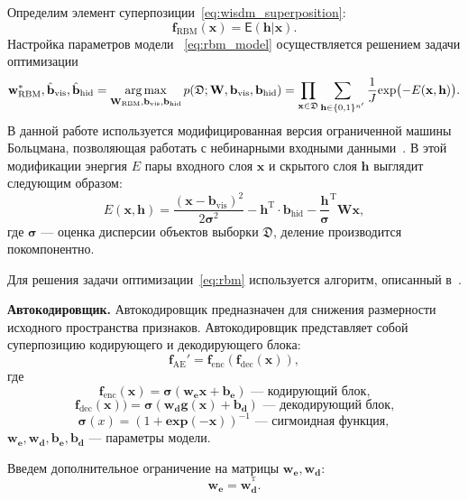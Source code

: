 Определим элемент суперпозиции~\eqref{eq:wisdm_superposition}: 
\begin{equation}
\label{eq:rbm_model}
\mathbf{f}_\text{RBM}(\mathbf{x}) = \mathsf{E}(\mathbf{h}|\mathbf{x}).
\end{equation}
Настройка параметров модели ~\eqref{eq:rbm_model} осуществляется решением задачи оптимизации
\begin{equation}
\label{eq:rbm}
{\mathbf{w}}^{*}_\text{RBM},\hat{\mathbf{b}}_\text{vis}, \hat{\mathbf{b}}_\text{hid} = \operatorname*{arg\,max}_{{\mathbf{W}_\text{RBM}},{\mathbf{b}}_\text{vis}, {\mathbf{b}}_\text{hid} } p(\mathfrak{D}; {\mathbf{W}},{\mathbf{b}_\text{vis}},{\mathbf{b}_\text{hid}}) = \prod_{\mathbf{x} \in \mathfrak{D}} \sum_{\mathbf{h}\in \{0,1\}^{n'}} \frac{1}{J} \text{exp}\bigl(-E(\mathbf{\mathbf{x}},\mathbf{h)}\bigr).
\end{equation}
В данной работе используется модифицированная версия ограниченной машины Больцмана, позволяющая работать с небинарными входными данными~\cite{gbrbm}. В этой модификации энергия $E$ пары входного слоя $\mathbf{x}$ и скрытого слоя $\mathbf{h}$ выглядит следующим образом:
\[
E(\mathbf{x},\mathbf{h}) = \frac{(\mathbf{x} - \mathbf{b}_\text{vis})^2}{2\boldsymbol{\sigma}^2} -\mathbf{h}^\text{T} \cdot \mathbf{b}_\text{hid} - \frac{\mathbf{h}}{\boldsymbol{\sigma}}^\text{T}\mathbf{W}\mathbf{x},
\]
где $\boldsymbol{\sigma}$ --- оценка дисперсии объектов выборки $\mathfrak{D}$, деление производится покомпонентно.

Для решения задачи оптимизации~\eqref{eq:rbm} используется алгоритм, описанный в~\cite{hinton_rbm}.

\textbf{Автокодировщик.}
Автокодировщик предназначен для снижения размерности исходного пространства признаков.
Автокодировщик представляет собой суперпозицию кодирующего и декодирующего блока:
\[
 \mathbf{f}_\text{AE}' = \mathbf{f}_\text{enc}(\mathbf{f}_\text{dec}(\mathbf{x})),
\]
где $$ \mathbf{f}_\text{enc}(\mathbf{x}) = \boldsymbol{\sigma}(\mathbf{w}_\textbf{e}\mathbf{x}+\mathbf{b}_\textbf{e}) \text{ --- кодирующий блок,}$$
$$  \mathbf{f}_\text{dec}(\mathbf{x})) = \boldsymbol{\sigma}(\mathbf{w}_\textbf{d}\mathbf{g}(\mathbf{x})+\mathbf{b}_\textbf{d})\text{ --- декодирующий блок,}$$ $$\boldsymbol{\sigma}(x) = (1+\textbf{exp}({-\mathbf{x}}))^{-1} \text{ --- сигмоидная функция},$$ $\mathbf{w}_\textbf{e},\mathbf{w}_\textbf{d},\mathbf{b}_\textbf{e}, \mathbf{b}_\textbf{d}$ --- параметры модели.

Введем дополнительное ограничение на матрицы $\mathbf{w}_\textbf{e}, \mathbf{w}_\textbf{d}$:
\[
 \mathbf{w}_\textbf{e} = \mathbf{w}_\textbf{d}^{^\text{T}}.
\]

